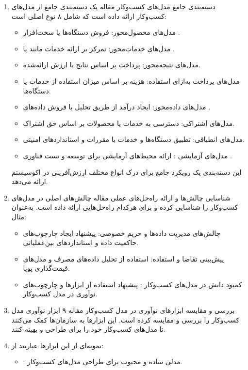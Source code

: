 \documentclass[10pt, twocolumn]{article}
\begin{document}
\begin{enumerate}
\item 
دسته‌بندی جامع مدل‌های کسب‌وکار   
   مقاله یک دسته‌بندی جامع از مدل‌های کسب‌وکار  ارائه داده است که شامل ۸ نوع اصلی است:  
\begin{itemize}
\item مدل‌های محصول‌محور: فروش دستگاه‌ها یا سخت‌افزار .  
\item مدل‌های خدمات‌محور: تمرکز بر ارائه خدمات مانند  یا .  
\item مدل‌های نتیجه‌محور: پرداخت بر اساس نتایج یا ارزش ارائه‌شده.  
\item مدل‌های پرداخت به‌ازای استفاده: هزینه بر اساس میزان استفاده از خدمات یا دستگاه‌ها.  
\item مدل‌های داده‌محور: ایجاد درآمد از طریق تحلیل یا فروش داده‌های .  
\item مدل‌های اشتراکی: دسترسی به خدمات یا محصولات بر اساس حق اشتراک.  
\item مدل‌های انطباقی: تطبیق دستگاه‌ها و خدمات با مقررات و استانداردهای امنیتی.  
\item مدل‌های آزمایشی : ارائه محیط‌های آزمایشی برای توسعه و تست فناوری .  
\end{itemize}

   این دسته‌بندی یک رویکرد جامع برای درک انواع مختلف ارزش‌آفرینی در اکوسیستم  ارائه می‌دهد.  

\item
شناسایی چالش‌ها و ارائه راه‌حل‌های عملی  
   مقاله چالش‌های اصلی در مدل‌های کسب‌وکار  را شناسایی کرده و برای هرکدام راه‌حل‌هایی ارائه داده است. به‌عنوان مثال:  

\begin{itemize}
\item چالش‌های مدیریت داده‌ها و حریم خصوصی: پیشنهاد ایجاد چارچوب‌های حاکمیت داده و استانداردهای بین‌عملیاتی.  
\item پیش‌بینی تقاضا و استفاده: استفاده از تحلیل داده‌های مصرف و مدل‌های قیمت‌گذاری پویا.  
\item کمبود دانش در مدل‌های کسب‌وکار : پیشنهاد استفاده از ابزارها و چارچوب‌های نوآوری در مدل کسب‌وکار.  
\end{itemize}

\item 
بررسی و مقایسه ابزارهای نوآوری در مدل کسب‌وکار   
   مقاله ۹ ابزار نوآوری مدل کسب‌وکار  را بررسی و مقایسه کرده است. این ابزارها به سازمان‌ها کمک می‌کنند تا مدل‌های کسب‌وکار خود را برای  طراحی و بهینه کنند.  
\item نمونه‌ای از این ابزارها عبارتند از:  
\begin{itemize}
\item {}:
مدلی ساده و محبوب برای طراحی مدل‌های کسب‌وکار.  


\end{itemize}
\end{enumerate}
\end{document}
